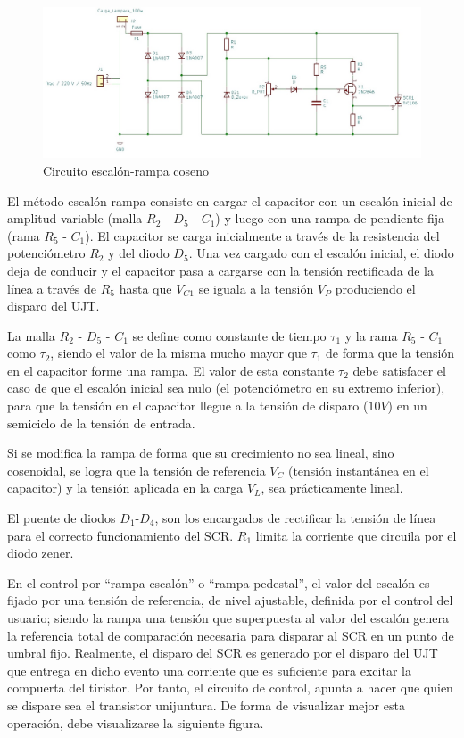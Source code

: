 \documentclass{article}
\begin{document}
\begin{figure}[h]
 \begin{center}
	\includegraphics[scale=0.6]{imagenes/fig2.jpg} 
	\caption{Circuito escalón-rampa coseno}\label{fig:fig2}
 \end{center}
\end{figure}

El método escalón-rampa consiste en cargar el capacitor con un escalón inicial de amplitud variable (malla $R_2$ - $D_5$ - $C_1$) y luego con una rampa de pendiente fija (rama $R_5$ - $C_1$). El capacitor se carga inicialmente a través de la resistencia del potenciómetro $R_2$ y del diodo $D_5$. Una vez cargado con el escalón inicial, el diodo deja de conducir y el capacitor pasa a cargarse con la tensión rectificada de la línea a través de $R_5$ hasta que $V_{C1}$ se iguala a la tensión $V_P$ produciendo el disparo del UJT.

La malla $R_2$ - $D_5$ - $C_1$ se define como constante de tiempo $\tau_1$ y la rama $R_5$ - $C_1$ como $\tau_2$, siendo el valor de la misma mucho mayor que $\tau_1$ de forma que la tensión en el capacitor forme una rampa. El valor de esta constante $\tau_2$ debe satisfacer el caso de que el escalón inicial sea nulo (el potenciómetro en su extremo inferior), para que la tensión en el capacitor llegue a la tensión de disparo ($10 V$) en un semiciclo de la tensión de entrada.

Si se modifica la rampa de forma que su crecimiento no sea lineal, sino cosenoidal, se logra que la tensión de referencia $V_C$ (tensión instantánea en el capacitor) y la tensión aplicada en la carga $V_L$, sea prácticamente lineal.

El puente de diodos $D_1$-$D_4$, son los encargados de rectificar la tensión de línea para el correcto funcionamiento del SCR. $R_1$ limita la corriente que circuila por el diodo zener.

En el control por “rampa-escalón” o “rampa-pedestal”, el valor del escalón es fijado por una tensión de referencia, de nivel ajustable, definida por el control del usuario; siendo la rampa una                tensión que superpuesta al valor del escalón genera la referencia total de comparación             necesaria para disparar al SCR en un punto de umbral fijo. Realmente, el disparo del SCR es                 generado por el disparo del UJT que entrega en dicho evento una corriente que es suficiente                para excitar la compuerta del tiristor. Por tanto, el circuito de control, apunta a hacer que quien                 se dispare sea el transistor unijuntura. De forma de visualizar mejor esta operación, debe              visualizarse la siguiente figura.
\end{document}
